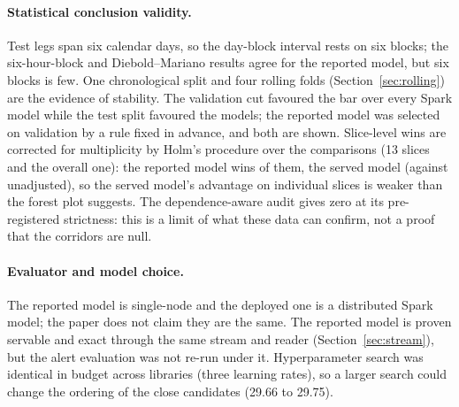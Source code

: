 \paragraph{Statistical conclusion validity.} Test legs span six calendar days, so the day-block interval rests on six blocks; the six-hour-block and Diebold--Mariano results agree for the reported model, but six blocks is few. One chronological split and four rolling folds (Section~\ref{sec:rolling}) are the evidence of stability. The validation cut favoured the bar over every Spark model while the test split favoured the models; the reported model was selected on validation by a rule fixed in advance, and both are shown. Slice-level wins are corrected for multiplicity by Holm's procedure over the \fzComparisonsTotal{} comparisons (13 slices and the overall one): the reported model wins \fzReportedWinsAfterHolm{} of them, the served model \fzServedWinsAfterHolm{} (against \fzServedWinsUnadjusted{} unadjusted), so the served model's advantage on individual slices is weaker than the forest plot suggests. The dependence-aware audit gives zero at its pre-registered strictness: this is a limit of what these data can confirm, not a proof that the corridors are null.

\paragraph{Evaluator and model choice.} The reported model is single-node and the deployed one is a distributed Spark model; the paper does not claim they are the same. The reported model is proven servable and exact through the same stream and reader\ifjournal{} (Section~\ref{sec:stream})\fi, but the alert evaluation was not re-run under it. Hyperparameter search was identical in budget across libraries (three learning rates), so a larger search could change the ordering of the close candidates (29.66 to 29.75).
